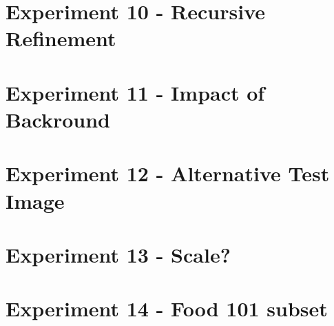 \section{Experiment 10 - Recursive Refinement}


\section{Experiment 11 - Impact of Backround}


\section{Experiment 12 - Alternative Test Image}


\section{Experiment 13 - Scale?}


\section{Experiment 14 - Food 101 subset}



